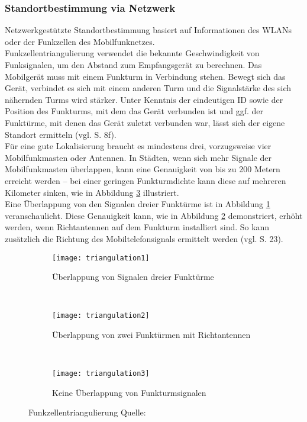 \subsubsection{Standortbestimmung via Netzwerk}
Netzwerkgestützte Standortbestimmung basiert auf Informationen des \glspl{WLAN} oder der Funkzellen des Mobilfunknetzes.\\ 
Funkzellentriangulierung verwendet die bekannte Geschwindigkeit von Funksignalen, um den Abstand zum Empfangsgerät zu berechnen. Das Mobilgerät muss mit einem Funkturm in Verbindung stehen. Bewegt sich das Gerät, verbindet es sich mit einem anderen Turm und die Signalstärke des sich nähernden Turms wird stärker. Unter Kenntnis der eindeutigen ID sowie der Position des Funkturms, mit dem das Gerät verbunden ist und ggf. der Funktürme, mit denen das Gerät zuletzt verbunden war, lässt sich der eigene Standort ermitteln (vgl. \cite{location} S. 8f). \\
Für eine gute Lokalisierung braucht es mindestens drei, vorzugsweise vier Mobilfunkmasten oder Antennen. In Städten, wenn sich mehr Signale der Mobilfunkmasten überlappen, kann eine Genauigkeit von bis zu 200 Metern erreicht werden -- bei einer geringen Funkturmdichte kann diese auf mehreren Kilometer sinken, wie in Abbildung \ref{fig:cell3} illustriert. \\
Eine Überlappung von den Signalen dreier Funktürme ist in Abbildung \ref{fig:cell1} veranschaulicht. Diese Genauigkeit kann, wie in Abbildung \ref{fig:cell2} demonstriert, erhöht werden, wenn Richtantennen auf dem Funkturm installiert sind. So kann zusätzlich die Richtung des Mobiltelefonsignals ermittelt werden (vgl. \cite{gps} S. 23). \\
\begin{figure}[H]
        \centering
        \begin{subfigure}[t]{0.23\textwidth}
                \texttt{[image: triangulation1]}
                \caption{Überlappung von Signalen dreier Funktürme}
                \label{fig:cell1}
        \end{subfigure}
        ~ 
        \begin{subfigure}[t]{0.23\textwidth}
                \texttt{[image: triangulation2]}
                \caption{Überlappung von zwei Funktürmen mit Richtantennen}
                \label{fig:cell2}
        \end{subfigure}
         ~ 
        \begin{subfigure}[t]{0.23\textwidth}
                \texttt{[image: triangulation3]}
                \caption{Keine Überlappung von Funkturmsignalen}
                \label{fig:cell3}
        \end{subfigure}
        \grayRule
        \caption[Funkzellentriangulierung]{Funkzellentriangulierung Quelle: \cite{fig:cell}}
        \label{fig:cell}
\end{figure}
